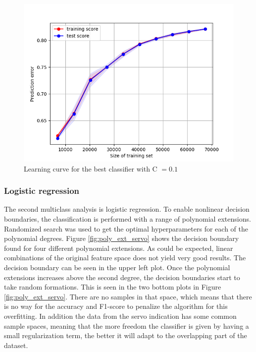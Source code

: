             \begin{figure}
                \centering
                \includegraphics[scale=0.6]{figures/analysis/svm/SVM_servo_C01_LC.png}
                \caption{Learning curve for the best classifier with C $= 0.1$}
                \label{fig:svm_servo_lc}
            \end{figure}
            
            
        \clearpage    
        \subsubsection{Logistic regression}
            The second multiclass analysis is logistic regression. To enable nonlinear decision boundaries, the classification is performed with a range of polynomial extensions. Randomized search was used to get the optimal hyperparameters for each of the polynomial degrees. Figure \ref{fig:poly_ext_servo} shows the decision boundary found for four different polynomial extensions. As could be expected, linear combinations of the original feature space does not yield very good results. The decision boundary can be seen in the upper left plot. Once the polynomial extensions increases above the second degree, the decision boundaries start to take random formations. This is seen in the two bottom plots in Figure \ref{fig:poly_ext_servo}. There are no samples in that space, which means that there is no way for the accuracy and F1-score to penalize the algorithm for this overfitting. In addition the data from the servo indication has some common sample spaces, meaning that the more freedom the classifier is given by having a small regularization term, the better it will adapt to the overlapping part of the dataset. 
            
